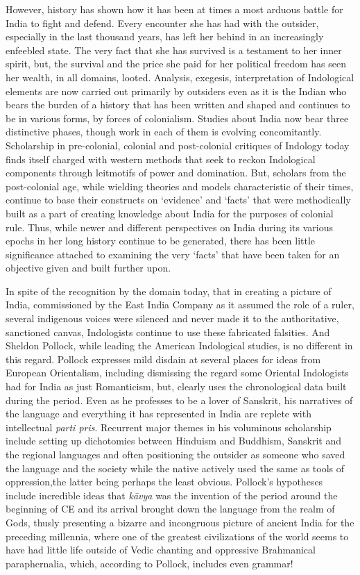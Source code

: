 However, history has shown how it has been at times a most arduous battle for India to fight and defend. Every encounter she has had with the outsider, especially in the last thousand years, has left her behind in an increasingly enfeebled state. The very fact that she has survived is a testament to her inner spirit, but, the survival and the price she paid for her political freedom has seen her wealth, in all domains, looted. Analysis, exegesis, interpretation of Indological elements are now carried out primarily by outsiders even as it is the Indian who bears the burden of a history that has been written and shaped and continues to be in various forms, by forces of colonialism. Studies about India now bear three distinctive phases, though work in each of them is evolving concomitantly. Scholarship in pre-colonial, colonial and post-colonial critiques of Indology today finds itself charged with western methods that seek to reckon Indological components through leitmotifs of power and domination. But, scholars from the post-colonial age, while wielding theories and models characteristic of their times, continue to base their constructs on ‘evidence’ and ‘facts’ that were methodically built as a part of creating knowledge about India for the purposes of colonial rule. Thus, while newer and different perspectives on India during its various epochs in her long history continue to be generated, there has been little significance attached to examining the very ‘facts’ that have been taken for an objective given and built further upon.

In spite of the recognition by the domain today, that in creating a picture of India, commissioned by the East India Company as it assumed the role of a ruler, several indigenous voices were silenced and never made it to the authoritative, sanctioned canvas, Indologists continue to use these fabricated falsities. And Sheldon Pollock, while leading the American Indological studies, is no different in this regard. Pollock expresses mild disdain at several places for ideas from European Orientalism, including dismissing the regard some Oriental Indologists had for India as just Romanticism, but, clearly uses the chronological data built during the period. Even as he professes to be a lover of Sanskrit, his narratives of the language and everything it has represented in India are replete with intellectual \textit{parti pris}. Recurrent major themes in his voluminous scholarship include setting up dichotomies between Hinduism and Buddhism, Sanskrit and the regional languages and often positioning the outsider as someone who saved the language and the society while the native actively used the same as tools of oppression,the latter being perhaps the least obvious. Pollock’s hypotheses include incredible ideas that \textit{kāvya} was the invention of the period around the beginning of CE and its arrival brought down the language from the realm of Gods, thusly presenting a bizarre and incongruous picture of ancient India for the preceding millennia, where one of the greatest civilizations of the world seems to have had little life outside of Vedic chanting and oppressive Brahmanical paraphernalia, which, according to Pollock, includes even grammar!

